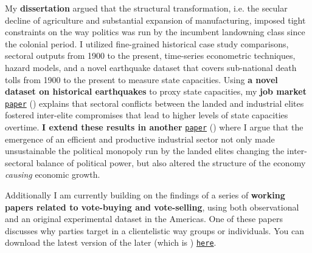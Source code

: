 \documentclass[10pt,stdletter,dateno,sigleft]{newlfm} %
\begin{document}
\begin{newlfm}
My {\bf dissertation} argued that the structural transformation, i.e. the secular decline of agriculture and substantial expansion of manufacturing, imposed tight constraints on the way politics was run by the incumbent landowning class since the colonial period. I utilized fine-grained historical case study comparisons, sectoral outputs from 1900 to the present, time-series econometric techniques, hazard models, and a novel earthquake dataset that covers sub-national death tolls from 1900 to the present to measure state capacities. Using {\bf a novel dataset on historical earthquakes} to proxy state capacities, my {\bf job market} \href{https://github.com/hbahamonde/Earthquake_Paper/raw/master/Bahamonde_Earthquake_Paper.pdf}{\texttt{paper}} (\emph{\unskip}) explains that sectoral conflicts between the landed and industrial elites fostered inter-elite compromises that lead to higher levels of state capacities overtime. {\bf I extend these results in another} \href{https://github.com/hbahamonde/Negative_Link_Paper/raw/master/Bahamonde_NegativeLink.pdf}{\texttt{paper}} (\emph{\unskip}) where I argue that the emergence of an efficient and productive industrial sector not only made unsustainable the political monopoly run by the landed elites changing the inter-sectoral balance of political power, but also altered the structure of the economy \emph{causing} economic growth. 


Additionally I am currently building on the findings of a series of {\bf working papers related to vote-buying and vote-selling}, using both observational and an original experimental dataset in the Americas. One of these papers discusses why parties target in a clientelistic way groups or individuals. You can download the latest version of the later (which is \emph{\unskip}) \href{https://github.com/hbahamonde/Clientelism_paper/raw/master/Bahamonde_Clientelism_Paper.pdf}{\texttt{here}}. 



{\unskip}




\end{newlfm}
\end{document}
